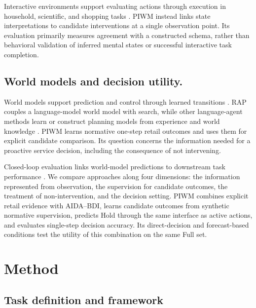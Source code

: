 \documentclass{article}
\begin{document}
Interactive environments support evaluating actions through execution in
household, scientific, and shopping tasks
\citep{puig2018virtualhome, shridhar2020alfred, Wang2022ScienceWorld, yao2022webshop}.
PIWM instead links state interpretations to candidate interventions at a
single observation point. Its evaluation primarily measures agreement
with a constructed schema, rather than behavioral validation of inferred
mental states or successful interactive task completion.

\subsection{World models and decision
utility.}\label{world-models-and-decision-utility.}

World models support prediction and control through learned transitions
\citep{ha2018world, hafner2020dreamer, hafner2023mastering}. RAP couples
a language-model world model with search, while other language-agent
methods learn or construct planning models from experience and world
knowledge
\citep{hao-etal-2023-reasoning, xiang2024language, guan2023leveraging, qiao2024agent, wang-etal-2025-world, fang-etal-2025-webevolver}.
PIWM learns normative one-step retail outcomes and uses them for
explicit candidate comparison. Its question concerns the information
needed for a proactive service decision, including the consequence of
not intervening.

Closed-loop evaluation links world-model predictions to downstream task
performance \citep{zhang2025world}. We compare approaches along four
dimensions: the information represented from observation, the
supervision for candidate outcomes, the treatment of non-intervention,
and the decision setting. PIWM combines explicit retail evidence with
AIDA--BDI, learns candidate outcomes from synthetic normative
supervision, predicts Hold through the same interface as active actions,
and evaluates single-step decision accuracy. Its direct-decision and
forecast-based conditions test the utility of this combination on the
same Full set.

\section{Method}\label{method}

\subsection{Task definition and
framework}\label{task-definition-and-framework}
\end{document}
